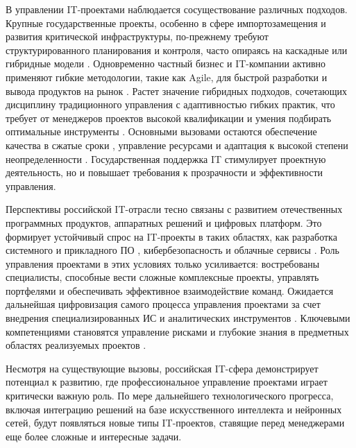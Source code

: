 В управлении IT-проектами наблюдается сосуществование различных подходов. Крупные государственные проекты, особенно в сфере импортозамещения и развития критической инфраструктуры, по-прежнему требуют структурированного планирования и контроля, часто опираясь на каскадные или гибридные модели \cite{management2}. Одновременно частный бизнес и IT-компании активно применяют гибкие методологии, такие как Agile, для быстрой разработки и вывода продуктов на рынок \cite{agile4}. Растет значение гибридных подходов, сочетающих дисциплину традиционного управления с адаптивностью гибких практик, что требует от менеджеров проектов высокой квалификации и умения подбирать оптимальные инструменты \cite{management8}. Основными вызовами остаются обеспечение качества в сжатые сроки \cite{management4}, управление ресурсами и адаптация к высокой степени неопределенности \cite{management3}.
Государственная поддержка IT стимулирует проектную деятельность, но и повышает требования к прозрачности и эффективности управления.

Перспективы российской IT-отрасли тесно связаны с развитием отечественных программных продуктов, аппаратных решений и цифровых платформ. Это формирует устойчивый спрос на IT-проекты в таких областях, как разработка системного и прикладного ПО \cite{architecture1}, кибербезопасность и облачные сервисы \cite{management10}. Роль управления проектами в этих условиях только усиливается: востребованы специалисты, способные вести сложные комплексные проекты, управлять портфелями и обеспечивать эффективное взаимодействие команд.
Ожидается дальнейшая цифровизация самого процесса управления проектами за счет внедрения специализированных ИС и аналитических инструментов \cite{devops1}. Ключевыми компетенциями становятся управление рисками и глубокие знания в предметных областях реализуемых проектов \cite{management6}.

Несмотря на существующие вызовы, российская IT-сфера демонстрирует потенциал к развитию, где профессиональное управление проектами играет критически важную роль. По мере дальнейшего технологического прогресса, включая интеграцию решений на базе искусственного интеллекта и нейронных сетей, будут появляться новые типы IT-проектов, ставящие перед менеджерами еще более сложные и интересные задачи.